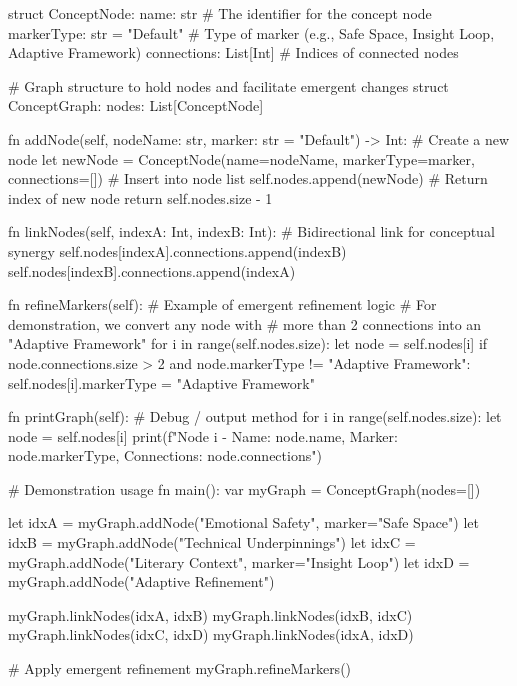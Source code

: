     struct ConceptNode:
        name: str                    # The identifier for the concept node
        markerType: str = "Default"  # Type of marker (e.g., Safe Space, Insight Loop, Adaptive Framework)
        connections: List[Int]       # Indices of connected nodes

    # Graph structure to hold nodes and facilitate emergent changes
    struct ConceptGraph:
        nodes: List[ConceptNode]

        fn addNode(self, nodeName: str, marker: str = "Default") -> Int:
            # Create a new node
            let newNode = ConceptNode(name=nodeName, markerType=marker, connections=[])
            # Insert into node list
            self.nodes.append(newNode)
            # Return index of new node
            return self.nodes.size - 1

        fn linkNodes(self, indexA: Int, indexB: Int):
            # Bidirectional link for conceptual synergy
            self.nodes[indexA].connections.append(indexB)
            self.nodes[indexB].connections.append(indexA)

        fn refineMarkers(self):
            # Example of emergent refinement logic
            # For demonstration, we convert any node with
            # more than 2 connections into an "Adaptive Framework"
            for i in range(self.nodes.size):
                let node = self.nodes[i]
                if node.connections.size > 2 and node.markerType != "Adaptive Framework":
                    self.nodes[i].markerType = "Adaptive Framework"

        fn printGraph(self):
            # Debug / output method
            for i in range(self.nodes.size):
                let node = self.nodes[i]
                print(f"Node {i} - Name: {node.name}, Marker: {node.markerType}, Connections: {node.connections}")

    # Demonstration usage
    fn main():
        var myGraph = ConceptGraph(nodes=[])

        let idxA = myGraph.addNode("Emotional Safety", marker="Safe Space")
        let idxB = myGraph.addNode("Technical Underpinnings")
        let idxC = myGraph.addNode("Literary Context", marker="Insight Loop")
        let idxD = myGraph.addNode("Adaptive Refinement")

        myGraph.linkNodes(idxA, idxB)
        myGraph.linkNodes(idxB, idxC)
        myGraph.linkNodes(idxC, idxD)
        myGraph.linkNodes(idxA, idxD)

        # Apply emergent refinement
        myGraph.refineMarkers()

